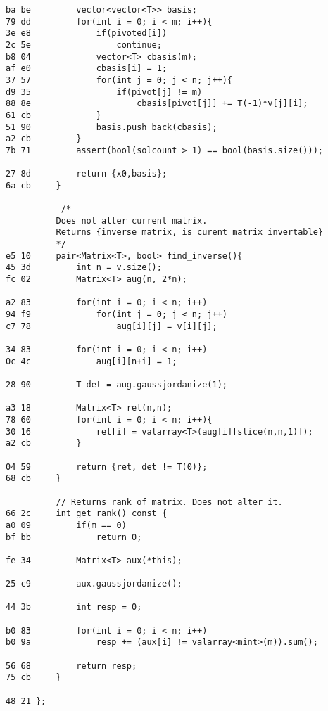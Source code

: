 \documentclass[11pt, a4paper, twoside]{article}
\begin{document}
\begin{lstlisting}
ba be         vector<vector<T>> basis;
79 dd         for(int i = 0; i < m; i++){
3e e8             if(pivoted[i])
2c 5e                 continue;
b8 04             vector<T> cbasis(m);
af e0             cbasis[i] = 1;
37 57             for(int j = 0; j < n; j++){
d9 35                 if(pivot[j] != m)
88 8e                     cbasis[pivot[j]] += T(-1)*v[j][i];
61 cb             } 
51 90             basis.push_back(cbasis);
a2 cb         }
7b 71         assert(bool(solcount > 1) == bool(basis.size()));
              
27 8d         return {x0,basis};
6a cb     }
          
           /*
          Does not alter current matrix.
          Returns {inverse matrix, is curent matrix invertable}
          */
e5 10     pair<Matrix<T>, bool> find_inverse(){
45 3d         int n = v.size();
fc 02         Matrix<T> aug(n, 2*n);
      
a2 83         for(int i = 0; i < n; i++)
94 f9             for(int j = 0; j < n; j++)
c7 78                 aug[i][j] = v[i][j];
                  
34 83         for(int i = 0; i < n; i++)
0c 4c             aug[i][n+i] = 1;
      
28 90         T det = aug.gaussjordanize(1);
      
a3 18         Matrix<T> ret(n,n);
78 60         for(int i = 0; i < n; i++){
30 16             ret[i] = valarray<T>(aug[i][slice(n,n,1)]);
a2 cb         }
      
04 59         return {ret, det != T(0)};
68 cb     }
      
          // Returns rank of matrix. Does not alter it.
66 2c     int get_rank() const {
a0 09         if(m == 0)
bf bb             return 0;
      
fe 34         Matrix<T> aux(*this);
      
25 c9         aux.gaussjordanize();
      
44 3b         int resp = 0;
      
b0 83         for(int i = 0; i < n; i++)
b0 9a             resp += (aux[i] != valarray<mint>(m)).sum();
      
56 68         return resp;
75 cb     }
      
48 21 };
\end{lstlisting}
\end{document}
